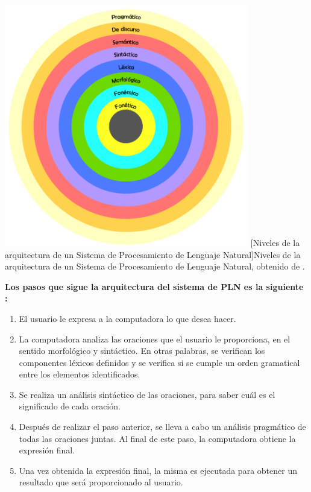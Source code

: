 \begin{center}
    \includegraphics[width=0.8\textwidth]{Images/Cap 2/Niveles_Arquitectura_PLN.png}
    [Niveles de la arquitectura de un Sistema de Procesamiento de Lenguaje Natural]{Niveles de la arquitectura de un Sistema de Procesamiento de Lenguaje Natural, obtenido de \cite{ref46}.}  %
\end{center}

\textbf{Los pasos que sigue la arquitectura del sistema de PLN es la siguiente \cite{ref46}:}
\begin{enumerate}
    \item El usuario le expresa a la computadora lo que desea hacer.\\
    \item La computadora analiza las oraciones que el usuario le proporciona, en el sentido morfológico y sintáctico. En otras palabras, se verifican los componentes léxicos definidos y se verifica si se cumple un orden gramatical entre los elementos identificados.\\
    \item Se realiza un análisis sintáctico de las oraciones, para saber cuál es el significado de cada oración.\\
    \item Después de realizar el paso anterior, se lleva a cabo un análisis pragmático de todas las oraciones juntas. Al final de este paso, la computadora obtiene la expresión final.\\
    \item Una vez obtenida la expresión final, la misma es ejecutada para obtener un resultado que será proporcionado al usuario.
\end{enumerate}


